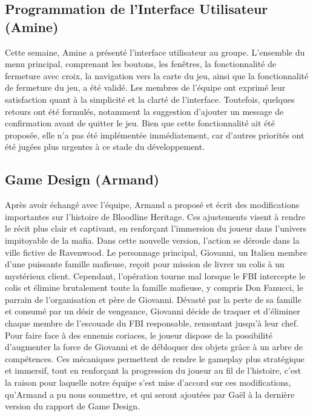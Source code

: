 \documentclass{report}
\begin{document}
\subsection*{Programmation de l'Interface Utilisateur (Amine)}
Cette semaine, Amine a présenté l’interface utilisateur au groupe. L’ensemble du menu principal, comprenant les boutons, les fenêtres, la fonctionnalité de fermeture avec croix, la navigation vers la carte du jeu, ainsi que la fonctionnalité de fermeture du jeu, a été validé. Les membres de l’équipe ont exprimé leur satisfaction quant à la simplicité et la clarté de l’interface. Toutefois, quelques retours ont été formulés, notamment la suggestion d’ajouter un message de confirmation avant de quitter le jeu. Bien que cette fonctionnalité ait été proposée, elle n’a pas été implémentée immédiatement, car d’autres priorités ont été jugées plus urgentes à ce stade du développement.

\newpage %

\subsection*{Game Design (Armand)}
Après avoir échangé avec l’équipe, Armand a proposé et écrit des modifications importantes sur l’histoire de Bloodline Heritage. Ces ajustements visent à rendre le récit plus clair et captivant, en renforçant l’immersion du joueur dans l’univers impitoyable de la mafia. Dans cette nouvelle version, l’action se déroule dans la ville fictive de Ravenwood. Le personnage principal, Giovanni, un Italien membre d’une puissante famille mafieuse, reçoit pour mission de livrer un colis à un mystérieux client. Cependant, l’opération tourne mal lorsque le FBI intercepte le colis et élimine brutalement toute la famille mafieuse, y compris Don Fanucci, le parrain de l’organisation et père de Giovanni. Dévasté par la perte de sa famille et consumé par un désir de vengeance, Giovanni décide de traquer et d’éliminer chaque membre de l’escouade du FBI responsable, remontant jusqu’à leur chef. Pour faire face à des ennemis coriaces, le joueur dispose de la possibilité d’augmenter la force de Giovanni et de débloquer des objets grâce à un arbre de compétences. Ces mécaniques permettent de rendre le gameplay plus stratégique et immersif, tout en renforçant la progression du joueur au fil de l’histoire, c'est la raison pour laquelle notre équipe s'est mise d'accord sur ces modifications, qu'Armand a pu nous soumettre, et qui seront ajoutées par Gaël à la dernière version du rapport de Game Design.
\end{document}
